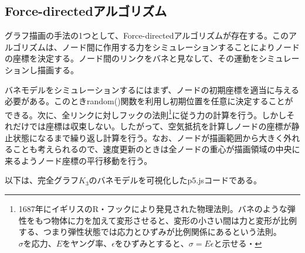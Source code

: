 \documentclass[dvipdfmx]{jsarticle}
\begin{document}
\subsection{Force-directedアルゴリズム}
グラフ描画の手法の1つとして、Force-directedアルゴリズムが存在する。このアルゴリズムは、ノード間に作用する力をシミュレーションすることによりノードの座標を決定する。ノード間のリンクをバネと見なして、その運動をシミュレーションし描画する。\par
バネモデルをシミュレーションするにはまず、ノードの初期座標を適当に与える必要がある。このときrandom()関数を利用し初期位置を任意に決定することができる。次に、全リンクに対しフックの法則\footnote{1687年にイギリスのR・フックにより発見された物理法則。バネのような弾性をもつ物体に力を加えて変形させると、変形の小さい間は力と変形が比例する、つまり弾性状態では応力とひずみが比例関係にあるという法則。$\sigma を応力、Eをヤング率、\epsilon をひずみとすると、\sigma = E\epsilon$と示せる・}に従う力の計算を行う。しかしそれだけでは座標は収束しない。したがって、空気抵抗を計算しノードの座標が静止状態になるまで繰り返し計算を行う。なお、ノードが描画範囲から大きく外れることも考えられるので、速度更新のときは全ノードの重心が描画領域の中央に来るようノード座標の平行移動を行う。\par
以下は、完全グラフ$K_{3}$のバネモデルを可視化したp5.jsコードである。
\end{document}
